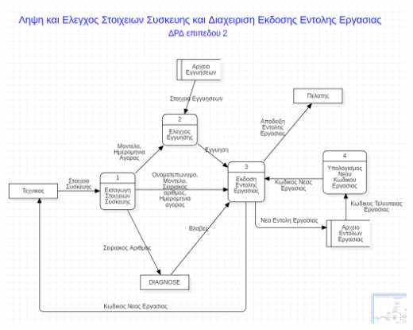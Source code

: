 \documentclass[12pt]{article}
\begin{document}
\begin{center}
\includegraphics[scale=0.7]{MerosB/B4}
\end{center}

\newpage
\end{document}
